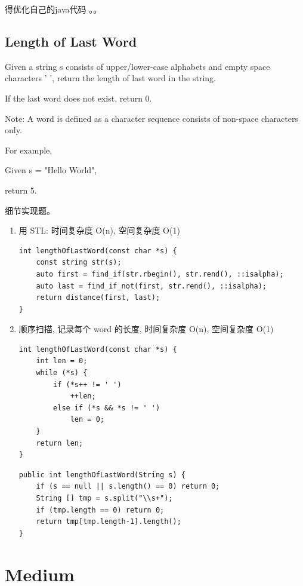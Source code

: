 \documentclass[12pt]{book}
\begin{document}
得优化自己的java代码 。。

\subsection{Length of Last Word}
\label{sec-2-1-8}
Given a string s consists of upper/lower-case alphabets and empty space characters ' ', return the length of last word in the string.

If the last word does not exist, return 0.

Note: A word is defined as a character sequence consists of non-space characters only.

For example, 

Given s = "Hello World",

return 5.

细节实现题。

\begin{enumerate}
\item 用 STL: 时间复杂度 O(n), 空间复杂度 O(1)
\label{sec-2-1-8-1}
\lstset{language=java,label= ,caption= ,numbers=none}
\begin{lstlisting}
int lengthOfLastWord(const char *s) {
    const string str(s);
    auto first = find_if(str.rbegin(), str.rend(), ::isalpha);
    auto last = find_if_not(first, str.rend(), ::isalpha);
    return distance(first, last);
}
\end{lstlisting}
\item 顺序扫描, 记录每个 word 的长度, 时间复杂度 O(n), 空间复杂度 O(1)
\label{sec-2-1-8-2}
\lstset{language=java,label= ,caption= ,numbers=none}
\begin{lstlisting}
int lengthOfLastWord(const char *s) {
    int len = 0;
    while (*s) {
        if (*s++ != ' ')
            ++len;
        else if (*s && *s != ' ')
            len = 0;
    }
    return len;
}
\end{lstlisting}
\lstset{language=java,label= ,caption= ,numbers=none}
\begin{lstlisting}
public int lengthOfLastWord(String s) {
    if (s == null || s.length() == 0) return 0;
    String [] tmp = s.split("\\s+");
    if (tmp.length == 0) return 0;
    return tmp[tmp.length-1].length();
}
\end{lstlisting}
\end{enumerate}
\section{Medium}
\label{sec-2-2}
\end{document}
